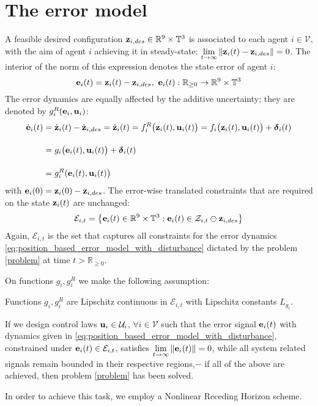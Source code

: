 \section{The error model}

A feasible desired configuration
$\bm{\mathbf{z}}_{i,des} \in \mathbb{R}^9 \times \mathbb{T}^3$
is associated to each agent $i \in \mathcal{V}$, with the aim of agent $i$
achieving it in steady-state:
$\lim\limits_{t \to \infty} \|\bm{\mathbf{z}}_i(t) - \bm{\mathbf{z}}_{i,des}\| = 0$. The
interior of the norm of this expression denotes the state error of agent $i$:
$$\bm{\mathbf{e}}_i(t) = \bm{\mathbf{z}}_i(t) - \bm{\mathbf{z}}_{i,des},\ \bm{\mathbf{e}}_i(t) :
\mathbb{R}_{\geq 0} \to \mathbb{R}^9 \times \mathbb{T}^3$$
The error dynamics are equally affected by the additive uncertainty;
they are denoted by $g_i^R(\bm{\mathbf{e}}_i, \bm{\mathbf{u}}_i)$:
\begin{align}
  \dot{\bm{\mathbf{e}}}_i(t) &= \dot{\bm{\mathbf{z}}}_i(t) - \dot{\bm{\mathbf{z}}}_{i,des} =
  \dot{\bm{\mathbf{z}}}_i(t) = f_i^R\big(\bm{\mathbf{z}}_i(t), \bm{\mathbf{u}}_i(t)\big) =  f_i \big(\bm{\mathbf{z}}_i (t), \bm{\mathbf{u}}_i (t)\big) + \bm{\mathbf{\delta}}_i(t) \\[2.5ex]
  &=g_i \big(\bm{\mathbf{e}}_i (t), \bm{\mathbf{u}}_i (t)\big) + \bm{\mathbf{\delta}}_i(t) \\[2.5ex]
                      &= g_i^R(\bm{\mathbf{e}}_i(t), \bm{\mathbf{u}}_i(t)\big)
    \label{eq:position_based_error_model_with_disturbance}
\end{align}
with $\bm{\mathbf{e}}_i(0) = \bm{\mathbf{z}}_i(0) - \bm{\mathbf{z}}_{i,des}$.
The error-wise translated constraints that are required on the state
$\bm{\mathbf{z}}_i(t)$ are unchanged:
$$\mathcal{E}_{i,t} = \big\{\bm{\mathbf{e}}_i(t) \in \mathbb{R}^9 \times \mathbb{T}^3 :
\bm{\mathbf{e}}_i(t) \in \mathcal{Z}_{i,t} \ominus \bm{\mathbf{z}}_{i,des} \big\}$$
Again, $\mathcal{E}_{i,t} $ is the set that captures all constraints for the
error dynamics \eqref{eq:position_based_error_model_with_disturbance} dictated
by the problem \eqref{problem} at time $t > \mathbb{R}_{\geq 0}$.

On functions $g_i, g^R_i$ we make the following assumption:
\begin{bw_box}
  \begin{assumption}
  \label{ass:g_i_g_R_Lipschitz}

    Functions $g_i, g^R_i$ are Lipschitz continuous in $\mathcal{E}_{i,t}$
    with Lipschitz constants $L_{g_i}$.

\end{assumption}
\end{bw_box}

If we design control laws $\bm{\mathbf{u}}_i \in \mathcal{U}_i$,
$\forall i \in \mathcal{V}$ such that the error signal $\bm{\mathbf{e}}_i(t)$ with
dynamics given in \eqref{eq:position_based_error_model_with_disturbance}, constrained under
$\bm{\mathbf{e}}_i(t) \in \mathcal{E}_{i,t}$, satisfies
$\lim\limits_{t \to \infty} \|\bm{\mathbf{e}}_i(t)\| = 0$, while all system related
signals remain bounded in their respective regions,$-$ if all of the above are
achieved, then problem \eqref{problem} has been solved.

In order to achieve this task, we employ a Nonlinear Receding Horizon scheme.
